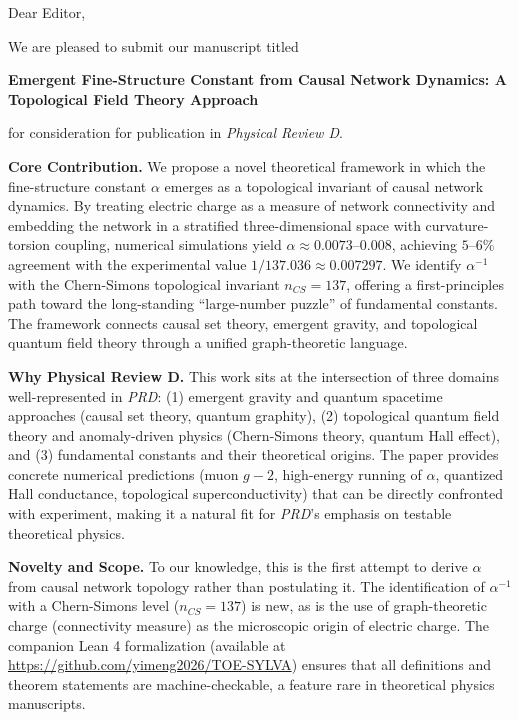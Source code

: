 Dear Editor,

We are pleased to submit our manuscript titled

\textbf{Emergent Fine-Structure Constant from Causal Network Dynamics: A Topological Field Theory Approach}

for consideration for publication in \textit{Physical Review D}.

\textbf{Core Contribution.}
We propose a novel theoretical framework in which the fine-structure constant $\alpha$ emerges as a topological invariant of causal network dynamics. By treating electric charge as a measure of network connectivity and embedding the network in a stratified three-dimensional space with curvature-torsion coupling, numerical simulations yield $\alpha \approx 0.0073\text{--}0.008$, achieving $5\text{--}6\%$ agreement with the experimental value $1/137.036 \approx 0.007297$. We identify $\alpha^{-1}$ with the Chern-Simons topological invariant $n_{CS} = 137$, offering a first-principles path toward the long-standing ``large-number puzzle'' of fundamental constants. The framework connects causal set theory, emergent gravity, and topological quantum field theory through a unified graph-theoretic language.

\textbf{Why Physical Review D.}
This work sits at the intersection of three domains well-represented in \textit{PRD}: (1) emergent gravity and quantum spacetime approaches (causal set theory, quantum graphity), (2) topological quantum field theory and anomaly-driven physics (Chern-Simons theory, quantum Hall effect), and (3) fundamental constants and their theoretical origins. The paper provides concrete numerical predictions (muon $g-2$, high-energy running of $\alpha$, quantized Hall conductance, topological superconductivity) that can be directly confronted with experiment, making it a natural fit for \textit{PRD}'s emphasis on testable theoretical physics.

\textbf{Novelty and Scope.}
To our knowledge, this is the first attempt to derive $\alpha$ from causal network topology rather than postulating it. The identification of $\alpha^{-1}$ with a Chern-Simons level ($n_{CS} = 137$) is new, as is the use of graph-theoretic charge (connectivity measure) as the microscopic origin of electric charge. The companion Lean 4 formalization (available at \url{https://github.com/yimeng2026/TOE-SYLVA}) ensures that all definitions and theorem statements are machine-checkable, a feature rare in theoretical physics manuscripts.

